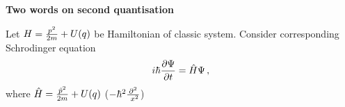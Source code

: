 



\def\p {\partial}
\def \D {\Delta_{d{\bf v}}}
\def \Ds  {\Delta^{\#}}
\def\t{\tilde}
\def\s {\sigma}
\def\L {\Lambda}
\def\Darboux {$z^A=$  $x^1,\dots,x^n$, $\theta_1,\dots,\theta_n$}
\def\a{\alpha}
\def\O{\Omega}
\def\d{\delta}
\def\dv  {{d{\bf{v}}}}
\def\A {{\cal A}}
\def\R {I\!R}
\def\t {\tilde}


\centerline {\bf Two words on second quantisation}

\bigskip

  Let $H={p^2\over 2m}+U(q)$ be Hamiltonian of classic system.
  Consider corresponding Schrodinger equation
                      $$
                   i\hbar {\p\Psi\over \p t}=\hat H \Psi\,,
                      $$
where $\hat H={\hat p^2\over 2m}+U(q)$ ($-\hbar^2 {\p^2\over \
x^2}$)

\bye
